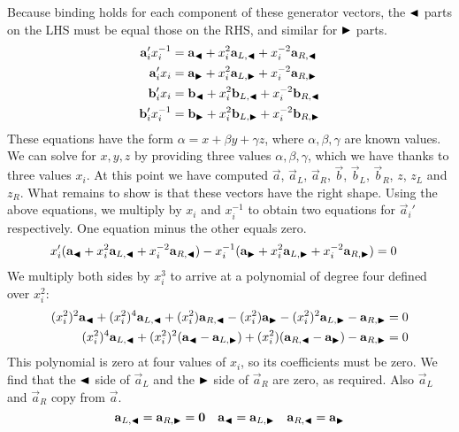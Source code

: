 %
Because binding holds for each component of these generator vectors,
the $\blacktriangleleft$ parts on the LHS must be equal those on the RHS,
and similar for $\blacktriangleright$ parts.
%
\begin{align*}
    \mathbf{a}_i'x_i^{-1} &= \mathbf{a}_\blacktriangleleft + x_i^2\mathbf{a}_{L, \blacktriangleleft} + x_i^{-2}\mathbf{a}_{R, \blacktriangleleft} \\
    \mathbf{a}_i'x_i &= \mathbf{a}_\blacktriangleright + x_i^2\mathbf{a}_{L, \blacktriangleright} + x_i^{-2}\mathbf{a}_{R, \blacktriangleright} \\
    \mathbf{b}_i'x_i &= \mathbf{b}_\blacktriangleleft + x_i^2\mathbf{b}_{L, \blacktriangleleft} + x_i^{-2}\mathbf{b}_{R, \blacktriangleleft} \\
    \mathbf{b}_i'x_i^{-1} &= \mathbf{b}_\blacktriangleright + x_i^2\mathbf{b}_{L, \blacktriangleright} + x_i^{-2}\mathbf{b}_{R, \blacktriangleright}
\end{align*}
%
These equations have the form $\alpha = x + \beta y + \gamma z$,
where $\alpha, \beta, \gamma$ are known values.
We can solve for $x, y, z$ by providing three values $\alpha, \beta, \gamma$,
which we have thanks to three values $x_i$.
%
At this point we have computed $\vec{a}$, $\vec{a}_L$, $\vec{a}_R$, $\vec{b}$, $\vec{b}_L$, $\vec{b}_R$, $z$, $z_L$ and $z_R$.
What remains to show is that these vectors have the right shape.
%
Using the above equations,
we multiply by $x_i$ and $x_i^{-1}$ to obtain two equations for $\vec{a}_i'$ respectively.
One equation minus the other equals zero.
%
\begin{align*}
    x_i'( \mathbf{a}_\blacktriangleleft + x_i^2\mathbf{a}_{L, \blacktriangleleft} + x_i^{-2}\mathbf{a}_{R, \blacktriangleleft} ) - x_i^{-1} ( \mathbf{a}_\blacktriangleright + x_i^2\mathbf{a}_{L, \blacktriangleright} + x_i^{-2}\mathbf{a}_{R, \blacktriangleright} ) &= 0
\end{align*}
%
We multiply both sides by $x_i^3$ to arrive at a polynomial of degree four defined over $x_i^2$:
%
\begin{align*}
    (x_i^2)^2 \mathbf{a}_\blacktriangleleft + (x_i^2)^4 \mathbf{a}_{L, \blacktriangleleft} + (x_i^2) \mathbf{a}_{R, \blacktriangleleft} - (x_i^2) \mathbf{a}_\blacktriangleright - (x_i^2)^2 \mathbf{a}_{L, \blacktriangleright} - \mathbf{a}_{R, \blacktriangleright} &= 0 \\
    (x_i^2)^4 \mathbf{a}_{L, \blacktriangleleft} + (x_i^2)^2(\mathbf{a}_\blacktriangleleft - \mathbf{a}_{L, \blacktriangleright}) + (x_i^2)(\mathbf{a}_{R, \blacktriangleleft} - \mathbf{a}_\blacktriangleright) - \mathbf{a}_{R, \blacktriangleright} &= 0
\end{align*}
%
This polynomial is zero at four values of $x_i$,
so its coefficients must be zero.
We find that the $\blacktriangleleft$ side of $\vec{a}_L$ and the $\blacktriangleright$ side of $\vec{a}_R$ are zero,
as required.
Also $\vec{a}_L$ and $\vec{a}_R$ copy from $\vec{a}$.
%
\[
    \mathbf{a}_{L, \blacktriangleleft} =  \mathbf{a}_{R, \blacktriangleright} = \mathbf{0} \quad \mathbf{a}_{\blacktriangleleft} = \mathbf{a}_{L, \blacktriangleright} \quad \mathbf{a}_{R, \blacktriangleleft} = \mathbf{a}_{\blacktriangleright}
\]
